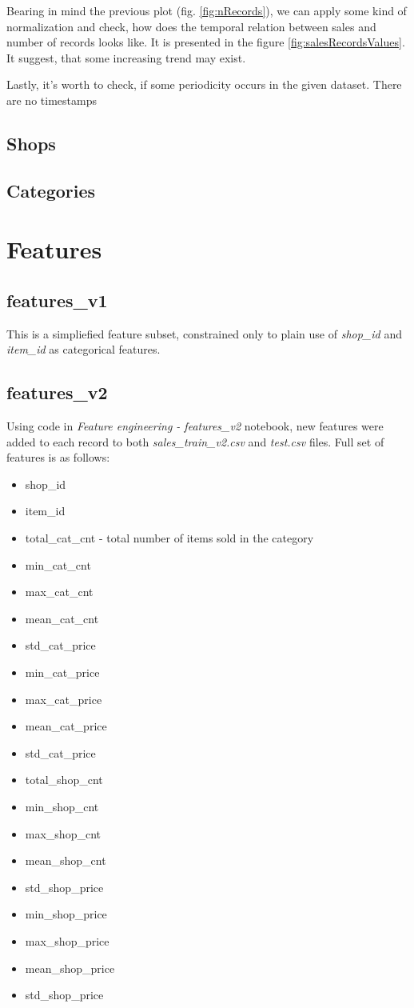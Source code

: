 \documentclass[12pt,twoside,a4paper]{memoir}
\begin{document}
	
Bearing in mind the previous plot (fig. \ref{fig:nRecords}), we can apply some kind of normalization and check, how does the temporal relation between sales and number of records looks like. It is presented in the figure \ref{fig:salesRecordsValues}.
 It suggest, that some increasing trend may exist.

Lastly, it's worth to check, if some periodicity occurs in the given dataset. There are no timestamps

\subsection{Shops}

\subsection{Categories}


\section{Features}
\subsection{features\_v1}
This is a simpliefied feature subset, constrained only to plain use of \textit{shop\_id} and \textit{item\_id} as categorical features.

\subsection{features\_v2} \label{featv2}
Using code in \textit{Feature engineering - features\_v2} notebook, new features were added to each record to both \textit{sales\_train\_v2.csv} and \textit{test.csv} files.
Full set of features is as follows:
\begin{itemize}
\item shop\_id
\item item\_id
\item total\_cat\_cnt - total number of items sold in the category
\item min\_cat\_cnt
\item max\_cat\_cnt
\item mean\_cat\_cnt
\item std\_cat\_price
\item min\_cat\_price
\item max\_cat\_price
\item mean\_cat\_price
\item std\_cat\_price
\item total\_shop\_cnt
\item min\_shop\_cnt
\item max\_shop\_cnt
\item mean\_shop\_cnt
\item std\_shop\_price
\item min\_shop\_price
\item max\_shop\_price
\item mean\_shop\_price
\item std\_shop\_price
\end{itemize}
\end{document}
